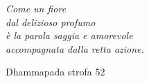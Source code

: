 \cleartorecto
\begin{quotepage}{60mm}
\centering
\itshape
Come un fiore\\
dal delizioso profumo\\
è la parola saggia e amorevole\\
accompagnata dalla retta azione.

{\smaller Dhammapada strofa 52}
\end{quotepage}

